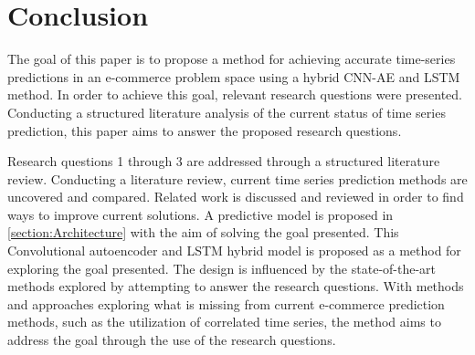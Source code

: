 \section{Conclusion}
\label{section:Discussion:Clonclusion}


The goal of this paper is to propose a method for achieving accurate time-series predictions in an e-commerce
problem space using a hybrid CNN-AE and LSTM method.
In order to achieve this goal, relevant research questions were presented.
Conducting a structured literature analysis of the current status of time series prediction,
this paper aims to answer the proposed research questions.

Research questions 1 through 3 are addressed through a structured literature review.
Conducting a literature review, current time series prediction methods are uncovered and compared.
Related work is discussed and reviewed in order to find ways to improve current solutions.
A predictive model is proposed in \autoref{section:Architecture} with the aim of solving the goal presented.
This Convolutional autoencoder and LSTM hybrid model is proposed as a method for exploring the goal presented.
The design is influenced by the state-of-the-art methods explored by attempting to answer the research questions.
With methods and approaches exploring what is missing from current e-commerce prediction methods,
such as the utilization of correlated time series, the method aims to address the goal through the use of the research questions.


 
